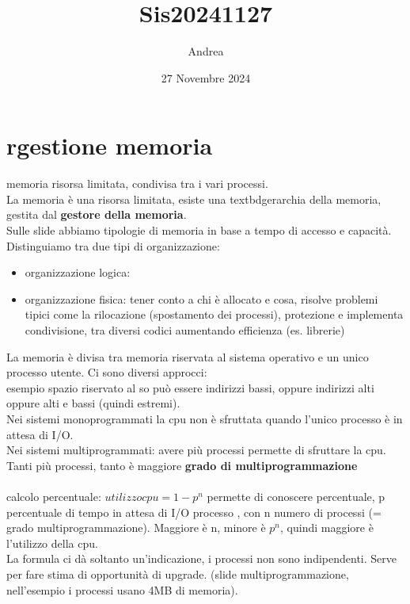 \documentclass{article}
\title{Sis20241127}
\author{Andrea}
\date{27 Novembre 2024}
\begin{document}
\maketitle
\tableofcontents
\section{rgestione memoria}
memoria risorsa limitata, condivisa tra i vari processi.\\
La memoria è una risorsa limitata, esiste una textbd{gerarchia della memoria}, gestita dal \textbf{gestore della memoria}.\\
Sulle slide abbiamo tipologie di memoria in base a tempo di accesso e capacità.\\
Distinguiamo tra due tipi di organizzazione:
\begin{itemize}
    \item organizzazione logica:
    \item organizzazione fisica: tener conto a chi è allocato e cosa, risolve problemi tipici come la rilocazione (spostamento dei processi), protezione e implementa condivisione, tra diversi codici aumentando efficienza (es. librerie)
\end{itemize}

La memoria è divisa tra memoria riservata al sistema operativo e un unico processo utente. Ci sono diversi approcci:\\
esempio spazio riservato al so può essere indirizzi bassi, oppure indirizzi alti oppure alti e bassi (quindi estremi).\\
Nei sistemi monoprogrammati la cpu non è sfruttata quando l'unico processo è in attesa di I/O.\\
Nei sistemi multiprogrammati: avere più processi permette di sfruttare la cpu. Tanti più processi, tanto è maggiore \textbf{grado di multiprogrammazione}\\
\paragraph{}{calcolo percentuale:} $utilizzo cpu = 1 - p^n$ permette di conoscere percentuale, p percentuale di tempo in attesa di I/O processo 
, con n numero di processi (= grado multiprogrammazione). Maggiore è n, minore è $p^n$, quindi maggiore è l'utilizzo della cpu.\\
La formula ci dà soltanto un'indicazione, i processi non sono indipendenti. Serve per fare stima di opportunità di upgrade.
(slide multiprogrammazione, nell'esempio i processi usano 4MB di memoria).
\end{document}
